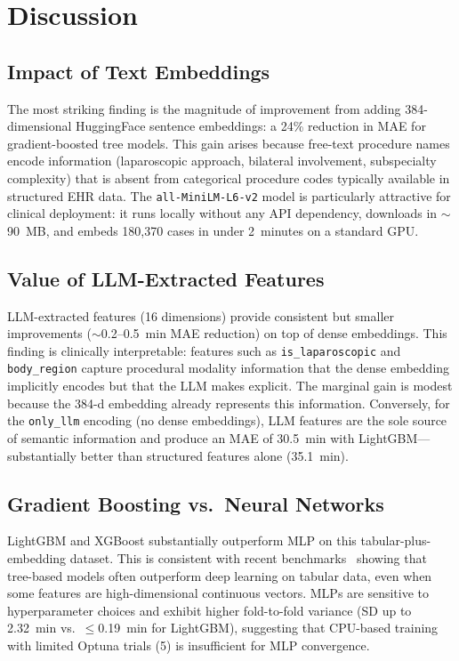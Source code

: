 \documentclass[11pt,twocolumn]{article}
\newcommand{\enc}[1]{\texttt{#1}}
\begin{document}
\section{Discussion}
\label{sec:discussion}

\subsection{Impact of Text Embeddings}
The most striking finding is the magnitude of improvement from adding 384-dimensional
HuggingFace sentence embeddings: a 24\% reduction in MAE for gradient-boosted tree
models.  This gain arises because free-text procedure names encode information
(laparoscopic approach, bilateral involvement, subspecialty complexity) that is
absent from categorical procedure codes typically available in structured EHR
data.  The \texttt{all-MiniLM-L6-v2} model is particularly attractive for
clinical deployment: it runs locally without any API dependency, downloads in
$\sim$90~MB, and embeds 180,370 cases in under 2~minutes on a standard GPU.

\subsection{Value of LLM-Extracted Features}
LLM-extracted features (16 dimensions) provide consistent but smaller improvements
($\sim$0.2--0.5~min MAE reduction) on top of dense embeddings.  This finding is
clinically interpretable: features such as \texttt{is\_laparoscopic} and
\texttt{body\_region} capture procedural modality information that the dense
embedding implicitly encodes but that the LLM makes explicit.  The marginal gain
is modest because the 384-d embedding already represents this information.
Conversely, for the \enc{only\_llm} encoding (no dense embeddings), LLM features
are the sole source of semantic information and produce an MAE of 30.5~min with
LightGBM—substantially better than structured features alone (35.1~min).

\subsection{Gradient Boosting vs.\ Neural Networks}
LightGBM and XGBoost substantially outperform MLP on this tabular-plus-embedding
dataset.  This is consistent with recent benchmarks~\cite{grinsztajn2022} showing
that tree-based models often outperform deep learning on tabular data, even when
some features are high-dimensional continuous vectors.  MLPs are sensitive to
hyperparameter choices and exhibit higher fold-to-fold variance (SD up to
2.32~min vs.\ $\leq$0.19~min for LightGBM), suggesting that CPU-based training
with limited Optuna trials (5) is insufficient for MLP convergence.
\end{document}
